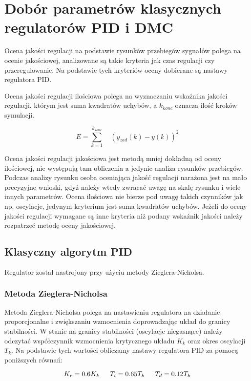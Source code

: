\section{Dobór parametrów klasycznych regulatorów PID i DMC}
\label{projekt:zad4}

Ocena jakości regulacji na podstawie rysunków przebiegów sygnałów polega na ocenie jakościowej, 
analizowane są takie kryteria jak czas regulacji czy przeregulowanie. 
Na podstawie tych kryteriów oceny dobierane są nastawy regulatora PID.

Ocena jakości regulacji ilościowa polega na wyznaczaniu wskaźnika jakości regulacji, 
którym jest suma kwadratów uchybów, a $k_{konc}$ oznacza ilość kroków symulacji. 



$$
E=\sum_{k=1}^{k_{konc}} \quad (y_{zad}(k)-y(k))^{2}
$$

Ocena jakości regulacji jakościowa jest metodą mniej dokładną od oceny ilościowej, 
nie występują tam obliczenia a jedynie analiza rysunków przebiegów. 
Podczas analizy rysunku osoba oceniająca jakość regulacji narażona jest na mało precyzyjne wnioski, 
gdyż należy wtedy zwracać uwagę na skalę rysunku i wiele innych parametrów. 
Ocena ilościowa nie bierze pod uwagę takich czynników jak np. oscylacje, 
jedynym kryterium jest suma kwadratów uchybów. 
Jeżeli do oceny jakości regulacji wymagane są inne kryteria niż podany wskaźnik jakości 
należy rozpatrzeć metodę oceny jakościowej.

\subsection{Klasyczny algorytm PID}
\label{projekt:zad4:PID}

Regulator został nastrojony przy użyciu metody Zieglera-Nicholsa.

\subsubsection{Metoda Zieglera-Nicholsa}

Metoda Zieglera-Nicholsa polega na nastawieniu regulatora
na działanie proporcjonalne i zwiększaniu wzmocnienia
doprowadzając układ do granicy stabilności. W stanie na granicy
stabilności (oscylacje niegasnące) należy odczytać współczynnik
wzmocnienia krytycznego układu $K_{k}$ oraz okres oscylacji $T_{k}$.
Na podstawie tych wartości obliczamy nastawy regulatora PID za pomocą poniższych równań:

$$ K_{r}=0.6K_{k} \indent T_{i}=0.65T_{k} \indent T_{d}=0.12T_{k}  $$

